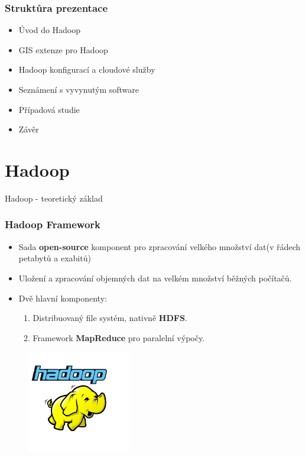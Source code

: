 \documentclass[unicode,bookmarksnumbered]{beamer}
\begin{document}
	\begin{frame}
		\frametitle{Struktůra prezentace}
		\begin{itemize}
			\item Úvod do Hadoop 
			\item GIS extenze pro Hadoop
			\item Hadoop konfigurací a cloudové služby
			\item Seznámení s vyvynutým software
			\item Případová studie
			\item Závěr
		\end{itemize}
	\end{frame}
%


	\section{Hadoop}
	\begin{frame}[c]
		\begin{center}	
		\Huge Hadoop - teoretický základ
		\end{center}
	\end{frame}
 
	\begin{frame}
		\frametitle{Hadoop Framework}

			\begin{itemize}
				\item Sada \textbf{open-source} komponent pro zpracování velkého množství
dat(v řádech petabytů a exabitů)  
				\item Uložení a zpracování objemných dat na velkém množství běžných počítačů. 
				\item Dvě hlavní komponenty:
				\begin{enumerate}
					\item Distribuovaný file systém, nativně \textbf{HDFS}.
					\item Framework \textbf{MapReduce} pro paralelní výpočy.
				\end{enumerate}
			\end{itemize}
			\begin{figure}
				\centering
				\includegraphics[width=0.4\textwidth]{./img/hadoop/hadoop_logo.jpg}
			\end{figure}
	\end{frame}
%
\end{document}
